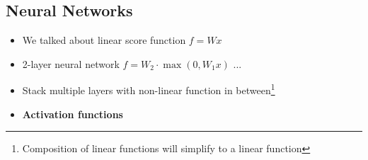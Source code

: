 \subsection{Neural Networks}
\begin{itemize}
	\item We talked about linear score function $f = Wx$
	\item 2-layer neural network $f = W_2 \cdot \max(0, W_1x)$ ...
	\item Stack multiple layers with non-linear function in between\footnote{Composition of linear functions will simplify to a linear function}
	\item \textbf{Activation functions}
\end{itemize}